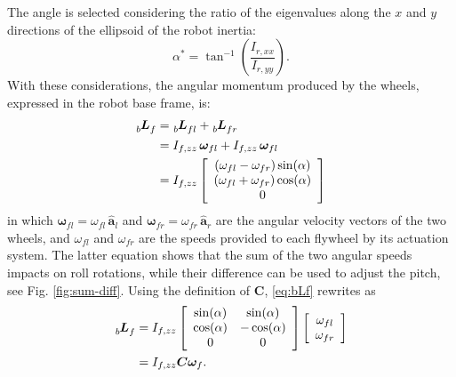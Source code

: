 \documentclass[letterpaper, 10 pt, conference]{ieeeconf}  %
\begin{document}
The angle is selected considering the ratio of the eigenvalues along the $x$ and $y$ directions of the ellipsoid of the robot inertia:
\begin{equation*}
\alpha^{*}=\tan^{-1}\left(\dfrac{I_{r, xx}}{I_{r, yy}}\right).
\end{equation*}
With these considerations, the angular momentum produced by the wheels, expressed in the robot base frame, is:
\begin{equation}
\begin{split}
\tensor[_b]{\bm{L}}{_f} &= \tensor[_b]{\bm{L}}{_{fl}} + \tensor[_b]{\bm{L}}{_{fr}} \\
&=I_{f, zz} \, \bm{\omega}_{fl} + I_{f, zz} \, \bm{\omega}_{fl}\\
&=I_{f, zz}
\left[\begin{array}{c}
\left(\omega_{fl} - \omega_{fr}\right)\sin(\alpha) \\ 
\left(\omega_{fl} +  \omega_{fr}\right)\cos(\alpha) \\
0
\end{array}\right]
\end{split}
\label{eq:bLf}
\end{equation}
in which $\bm{\omega}_{fl}= \omega_{fl} \, \hat{\bm{a}}_{l}$ and $\bm{\omega}_{fr}= \omega_{fr} \, \hat{\bm{a}}_{r}$ are the angular velocity vectors of the two wheels, and $\omega_{fl}$ and $\omega_{fr}$ are the speeds provided to each flywheel by its actuation system. The latter equation shows that the sum of the two angular speeds impacts on roll rotations, while their difference can be used to adjust the pitch, see Fig. \ref{fig:sum-diff}. Using the definition of $\bm{C}$, \eqref{eq:bLf} rewrites as
\begin{equation}
\begin{split}
\tensor[_b]{\bm{L}}{_f} & = I_{f,zz}
\left[
\begin{array}{cc}
\sin(\alpha) & \sin(\alpha) \\
\cos(\alpha) & -\cos(\alpha) \\
0 & 0
\end{array}
\right]
\left[
\begin{array}{cc}
\omega_{fl} \\
\omega_{fr}
\end{array}
\right] \\
&= I_{f,zz} \bm{C} \bm{\omega}_f.
\end{split}
\end{equation}
\end{document}
